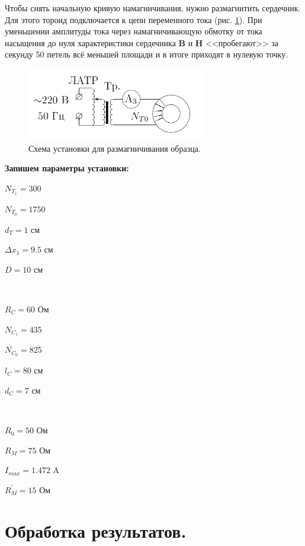 \documentclass[a4paper, 12pt, twoside]{article}
\begin{document}
Чтобы снять начальную кривую намагничивания, нужно размагнитить сердечник. Для этого тороид подключается к цепи переменного тока (рис. \ref{schem3}). При уменьшении амплитуды тока через намагничивающую обмотку от тока насыщения до нуля характеристики сердечника \textbf{B} и \textbf{H} <<пробегают>> за секунду 50 петель всё меньшей площади и в итоге приходят в нулевую точку.
\begin{figure}[H]
	\centering
	\includegraphics[width = 0.7\textwidth]{schem3}
	\caption{Схема установки для размагничивания образца.}
	\label{schem3}
\end{figure}

\textbf{Запишем параметры установки:}


\begin{minipage}{0.3 \linewidth}
	$N_{T_1} = 300$
	
	$N_{T_0} = 1750$
	
	$d_T = 1$ см
	
	$\Delta x_1 = 9.5$ см
	
	$D = 10$ см
	
\end{minipage}
~
\begin{minipage}{0.3 \linewidth}
	$R_C = 60$ Ом
	
	$N_{C_1} = 435$
	
	$N_{C_0} = 825$
	
	$l_C = 80$ см
	
	$d_C = 7$ см
\end{minipage}
~
\begin{minipage}{0.3 \linewidth}
	
	$R_0 = 50$ Ом
	
	$R_M = 75$ Ом
	
	$I_{max} = 1.472$ A
	
	$R_M^{'} = 15$ Ом
\end{minipage}

\newpage

\section{Обработка результатов.}
\end{document}
